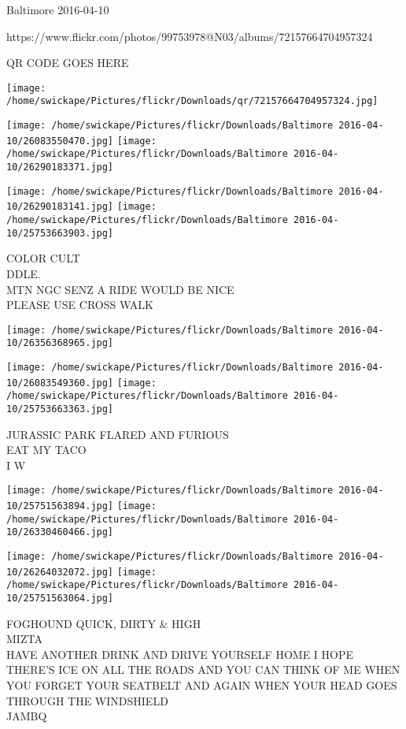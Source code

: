 \documentclass[10pt,letterpaper]{article}
\begin{document}
Baltimore 2016-04-10

https://www.flickr.com/photos/99753978@N03/albums/72157664704957324

QR CODE GOES HERE

\texttt{[image: /home/swickape/Pictures/flickr/Downloads/qr/72157664704957324.jpg]}
\pagebreak

\texttt{[image: /home/swickape/Pictures/flickr/Downloads/Baltimore 2016-04-10/26083550470.jpg]}
\texttt{[image: /home/swickape/Pictures/flickr/Downloads/Baltimore 2016-04-10/26290183371.jpg]}

\texttt{[image: /home/swickape/Pictures/flickr/Downloads/Baltimore 2016-04-10/26290183141.jpg]}
\texttt{[image: /home/swickape/Pictures/flickr/Downloads/Baltimore 2016-04-10/25753663903.jpg]}

COLOR CULT\\
DDLE.\\
MTN NGC SENZ A RIDE WOULD BE NICE\\
PLEASE USE CROSS WALK\\
\pagebreak

\texttt{[image: /home/swickape/Pictures/flickr/Downloads/Baltimore 2016-04-10/26356368965.jpg]}

\vspace{0.25in}
\texttt{[image: /home/swickape/Pictures/flickr/Downloads/Baltimore 2016-04-10/26083549360.jpg]}
\texttt{[image: /home/swickape/Pictures/flickr/Downloads/Baltimore 2016-04-10/25753663363.jpg]}

JURASSIC PARK FLARED AND FURIOUS\\
EAT MY TACO\\
I W\\
\pagebreak

\texttt{[image: /home/swickape/Pictures/flickr/Downloads/Baltimore 2016-04-10/25751563894.jpg]}
\texttt{[image: /home/swickape/Pictures/flickr/Downloads/Baltimore 2016-04-10/26330460466.jpg]}

\texttt{[image: /home/swickape/Pictures/flickr/Downloads/Baltimore 2016-04-10/26264032072.jpg]}
\texttt{[image: /home/swickape/Pictures/flickr/Downloads/Baltimore 2016-04-10/25751563064.jpg]}

FOGHOUND QUICK, DIRTY \& HIGH\\
MIZTA\\
HAVE ANOTHER DRINK AND DRIVE YOURSELF HOME I HOPE THERE'S ICE ON ALL THE ROADS AND YOU CAN THINK OF ME WHEN YOU FORGET YOUR SEATBELT AND AGAIN WHEN YOUR HEAD GOES THROUGH THE WINDSHIELD\\
JAMBQ\\
\pagebreak
\end{document}
